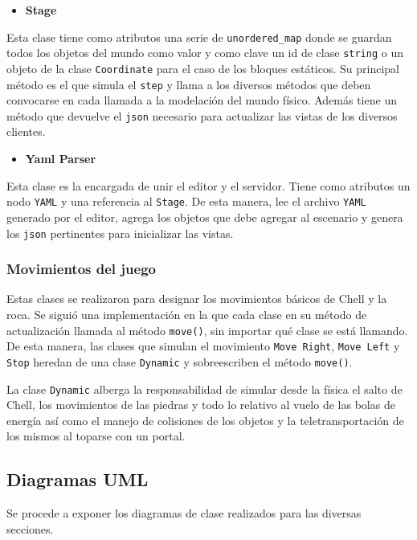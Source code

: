 \documentclass[a4paper]{article}
\begin{document}
\begin{itemize}
	\item \textbf{Stage}
\end{itemize}

Esta clase tiene como atributos una serie de \texttt{unordered\_map} donde se guardan todos los objetos del mundo como valor y como clave un id de clase \texttt{string} o un objeto de la clase \texttt{Coordinate} para el caso de los bloques estáticos. Su principal método es el que simula el \texttt{step} y llama a los diversos métodos que deben convocarse en cada llamada a la modelación del mundo físico. Además tiene un método que devuelve el \texttt{json} necesario para actualizar las vistas de los diversos clientes.

\begin{itemize}
	\item \textbf{Yaml Parser}
\end{itemize}
Esta clase es la encargada de unir el editor y el servidor. Tiene como atributos un nodo \texttt{YAML} y una referencia al \texttt{Stage}. De esta manera, lee el archivo \texttt{YAML} generado por el editor, agrega los objetos que debe agregar al escenario y genera los \texttt{json} pertinentes para inicializar las vistas.

\subsubsection{Movimientos del juego}

Estas clases se realizaron para designar los movimientos básicos de Chell y la roca. Se siguió una implementación en la que cada clase en su método de actualización llamada al método \texttt{move()}, sin importar qué clase se está llamando. De esta manera, las clases que simulan el movimiento \texttt{Move Right}, \texttt{Move Left} y \texttt{Stop} heredan de una clase \texttt{Dynamic} y sobreescriben el método \texttt{move()}.

La clase \texttt{Dynamic} alberga la responsabilidad de simular desde la física el salto de Chell, los movimientos de las piedras y todo lo relativo al vuelo de las bolas de energía así como el manejo de colisiones de los objetos y la teletransportación de los mismos al toparse con un portal.

\subsection{Diagramas UML}

Se procede a exponer los diagramas de clase realizados para las diversas secciones.
\end{document}
